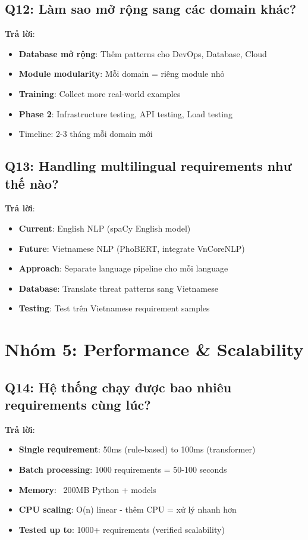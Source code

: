\documentclass[12pt,a4paper]{report}
\begin{document}
\subsection{Q12: Làm sao mở rộng sang các domain khác?}

\textbf{Trả lời}:
\begin{itemize}
    \item \textbf{Database mở rộng}: Thêm patterns cho DevOps, Database, Cloud
    \item \textbf{Module modularity}: Mỗi domain = riêng module nhỏ
    \item \textbf{Training}: Collect more real-world examples
    \item \textbf{Phase 2}: Infrastructure testing, API testing, Load testing
    \item Timeline: 2-3 tháng mỗi domain mới
\end{itemize}

\subsection{Q13: Handling multilingual requirements như thế nào?}

\textbf{Trả lời}:
\begin{itemize}
    \item \textbf{Current}: English NLP (spaCy English model)
    \item \textbf{Future}: Vietnamese NLP (PhoBERT, integrate VnCoreNLP)
    \item \textbf{Approach}: Separate language pipeline cho mỗi language
    \item \textbf{Database}: Translate threat patterns sang Vietnamese
    \item \textbf{Testing}: Test trên Vietnamese requirement samples
\end{itemize}

\section{Nhóm 5: Performance & Scalability}

\subsection{Q14: Hệ thống chạy được bao nhiêu requirements cùng lúc?}

\textbf{Trả lời}:
\begin{itemize}
    \item \textbf{Single requirement}: 50ms (rule-based) to 100ms (transformer)
    \item \textbf{Batch processing}: 1000 requirements = 50-100 seconds
    \item \textbf{Memory}: ~200MB Python + models
    \item \textbf{CPU scaling}: O(n) linear - thêm CPU = xử lý nhanh hơn
    \item \textbf{Tested up to}: 1000+ requirements (verified scalability)
\end{itemize}
\end{document}
